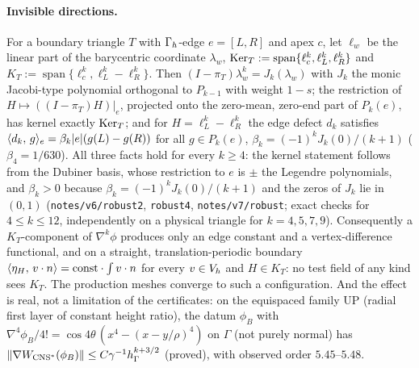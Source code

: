 \paragraph{Invisible directions.} For a boundary triangle $T$ with $\Gamma_h$-edge $e=[L,R]$ and apex $c$, let $\ell_w$ be the linear part of the barycentric coordinate $\lambda_w$, $\operatorname{Ker}_T:=\operatorname{span}\{\ell_c^k,\ell_L^k,\ell_R^k\}$ and $K_T:=\operatorname{span}\{\ell_c^k,\ell_L^k-\ell_R^k\}$. Then $(I-\pi_T)\lambda_w^k=J_k(\lambda_w)$ with $J_k$ the monic Jacobi-type polynomial orthogonal to $P_{k-1}$ with weight $1-s$; the restriction of $H\mapsto((I-\pi_T)H)|_e$, projected onto the zero-mean, zero-end part of $P_k(e)$, has kernel exactly $\operatorname{Ker}_T$; and for $H=\ell_L^k-\ell_R^k$ the edge defect $d_k$ satisfies $\langle d_k,\, g\rangle_e=\beta_k|e|(g(L)-g(R))$ for all $g\in P_k(e)$, $\beta_k=(-1)^kJ_k(0)/(k+1)$ ($\beta_4=1/630$). All three facts hold for every $k\ge4$: the kernel statement follows from the Dubiner basis, whose restriction to $e$ is $\pm$ the Legendre polynomials, and $\beta_k>0$ because $\beta_k=(-1)^kJ_k(0)/(k+1)$ and the zeros of $J_k$ lie in $(0,1)$ (\texttt{notes/v6/robust2}, \texttt{robust4}, \texttt{notes/v7/robust}; exact checks for $4\le k\le12$, independently on a physical triangle for $k=4,5,7,9$). Consequently a $K_T$-component of $\nabla^k\phi$ produces only an edge constant and a vertex-difference functional, and on a straight, translation-periodic boundary $\langle \eta_H,\, v\cdot n\rangle=\mathrm{const}\cdot\int v\cdot n$ for every $v\in V_h$ and $H\in K_T$: no test field of any kind sees $K_T$. The production meshes converge to such a configuration. And the effect is real, not a limitation of the certificates: on the equispaced family \textsf{UP} (radial first layer of constant height ratio), the datum $\phi_B$ with $\nabla^4\phi_B/4!=\cos4\theta\,(x^4-(x-y/\rho)^4)$ on $\Gamma$ (not purely normal) has $\lVert \nabla W_{\mathrm{CNS}^\ast}(\phi_B)\rVert\le C\gamma^{-1}h_\Gamma^{k+3/2}$ (proved), with observed order $5.45$--$5.48$.

